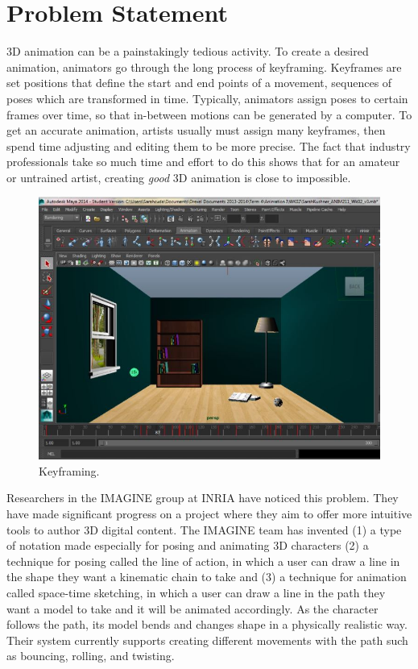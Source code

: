 \section{Problem Statement}
3D animation can be a painstakingly tedious activity. To create a desired animation, animators go through the long process of keyframing. Keyframes are set positions that define the start and end points of a movement, sequences of poses which are transformed in time. Typically, animators assign poses to certain frames over time, so that in-between motions can be generated by a computer. To get an accurate animation, artists usually must assign many keyframes, then spend time adjusting and editing them to be more precise. The fact that industry professionals take so much time and effort to do this shows that for an amateur or untrained artist, creating \textit{good} 3D animation is close to impossible.

\begin{figure}
\centering
\includegraphics[scale=0.4]{img/keyframe}
\caption{Keyframing.}
\end{figure}

Researchers in the IMAGINE group at INRIA have noticed this problem. They have made significant progress on a project where they aim to offer more intuitive tools to author 3D digital content. The IMAGINE team has invented (1) a type of notation made especially for posing and animating 3D characters (2) a technique for posing called the line of action, in which a user can draw a line in the shape they want a kinematic chain to take and (3) a technique for animation called space-time sketching, in which a user can draw a line in the path they want a model to take and it will be animated accordingly. As the character follows the path, its model bends and changes shape in a physically realistic way. Their system currently supports creating different movements with the path such as bouncing, rolling, and twisting.

